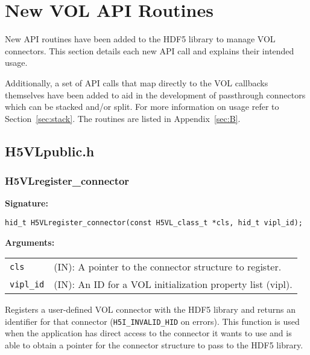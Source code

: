 \section{New VOL API Routines}
\label{sec:api}
New API routines have been added to the HDF5 library to manage VOL connectors. This section details each new API call and explains their intended usage.

Additionally, a set of API calls that map directly to the VOL callbacks themselves have been added to aid in the development of passthrough connectors which can be stacked and/or split. For more information on usage refer to Section~\ref{sec:stack}. The routines are listed in Appendix~\ref{sec:B}.

\bigskip

\subsection{H5VLpublic.h}

\subsubsection{H5VLregister\_connector}
\begin{mdframed}[style=bgbox]
\textbf{Signature:}
\begin{lstlisting}
hid_t H5VLregister_connector(const H5VL_class_t *cls, hid_t vipl_id);
\end{lstlisting}

\textbf{Arguments:}\\
\begin{tabular}{l p{13.5cm}}
  {\tt cls} & (IN): A pointer to the connector structure to register.\\
  {\tt vipl\_id} & (IN): An ID for a VOL initialization property list (vipl).\\
\end{tabular}
\end{mdframed}

Registers a user-defined VOL connector with the HDF5 library and returns an identifier for that connector (\texttt{H5I\_INVALID\_HID} on errors). This function is used when the application has direct access to the connector it wants to use and is able to obtain a pointer for the connector structure to pass to the HDF5 library.
\bigskip

